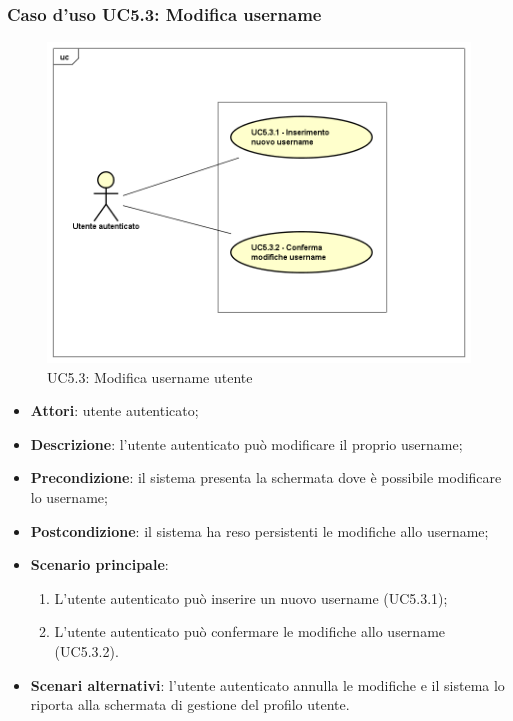 \subsubsection{Caso d'uso UC5.3: Modifica username}
\label{UC5.3}
\begin{figure}[h]
	\centering
	\includegraphics[scale=0.5,keepaspectratio]{UML/UC5_3.png}
	\caption{UC5.3: Modifica username utente}
\end{figure}
\begin{itemize}
	\item \textbf{Attori}: utente autenticato;
	\item \textbf{Descrizione}: l'utente autenticato può modificare il proprio username;
	\item \textbf{Precondizione}: il sistema presenta la schermata dove è possibile modificare lo username;
	\item \textbf{Postcondizione}: il sistema ha reso persistenti le modifiche allo username;
	\item \textbf{Scenario principale}:
	\begin{enumerate}
		\item L'utente autenticato può inserire un nuovo username (UC5.3.1);
		\item L'utente autenticato può confermare le modifiche allo username (UC5.3.2).
	\end{enumerate}
	\item \textbf{Scenari alternativi}: l'utente autenticato annulla le modifiche e il sistema lo riporta alla schermata di gestione del profilo utente.
\end{itemize}

